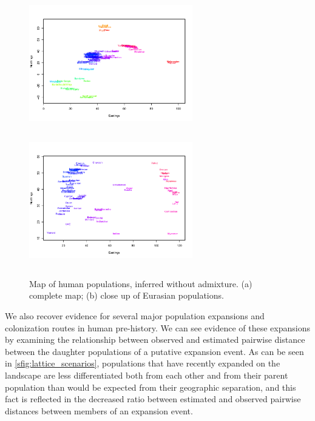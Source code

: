 \documentclass[12pt]{article}
\begin{document}
\begin{figure}
	\centering
			{\includegraphics[width=2.8in,height=2.3in]{figs/globetrotter/globe_NoAd_map.png}}
			{\includegraphics[width=2.8in,height=2.3in]{figs/globetrotter/globe_Eurasia_NoAd_map_indproc.png}}
	\caption{Map of human populations, inferred without admixture. (a) complete map; (b) close up of Eurasian 
populations.}\label{sfig:globe_noad_maps}
\end{figure}

We also recover evidence for several major population expansions and colonization routes in human pre-history.  We can see evidence of these expansions by examining the relationship between observed and estimated pairwise distance between the daughter populations of a putative expansion event.   As can be seen in \ref{sfig:lattice_scenarios}, populations that have recently expanded on the landscape are less differentiated both from each other and from their parent population than would be expected from their geographic separation, and this fact is reflected in the decreased ratio between estimated and observed pairwise distances between members of an expansion event.
\end{document}
